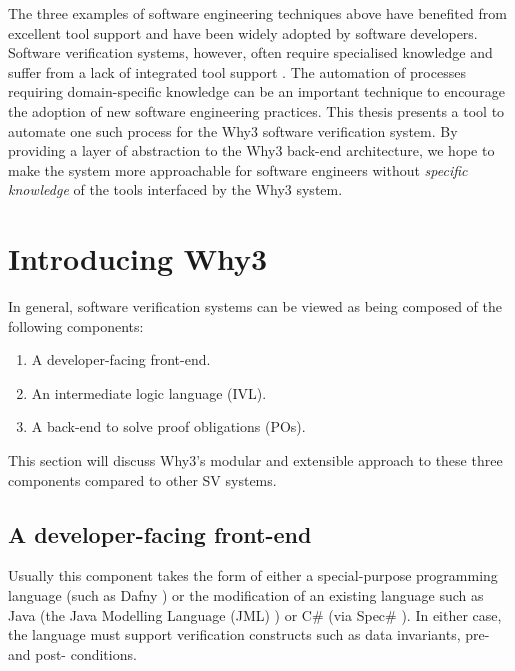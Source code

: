 The three examples of software engineering techniques above have benefited from excellent tool support and have been widely adopted by software developers.      
Software verification systems, however, often require specialised knowledge and suffer from a lack of integrated tool support \cite{Alglave2011}.     
The automation of processes requiring domain-specific knowledge can be an important technique to encourage the adoption of new software engineering practices.
This thesis presents a tool to automate one such process for the \textsf{Why3} \cite{why:shephard} software verification system. 
By providing a layer of abstraction to the \textsf{Why3} back-end architecture, we hope to make the system more approachable for software engineers without \textit{specific knowledge} of the tools interfaced by the \textsf{Why3} system. 
 
\section{Introducing \textsf{Why3}}
In general, software verification systems can be viewed as being composed of the following components: 

\begin{enumerate}
	\item A developer-facing front-end.
	\item An intermediate logic language (IVL).
	\item A back-end to solve proof obligations (POs).
\end{enumerate}

This section will discuss \textsf{Why3}'s modular and extensible approach to these three components compared to other SV systems. 

\subsection{A developer-facing front-end} 

Usually this component takes the form of either a special-purpose programming language (such as Dafny \cite{Dafny}) or the modification of an existing language such as Java (the Java Modelling Language (JML) \cite{JML}) or C\# (via Spec\# \cite{spec}). 
In either case, the language must support verification constructs such as data invariants, pre- and post- conditions.

